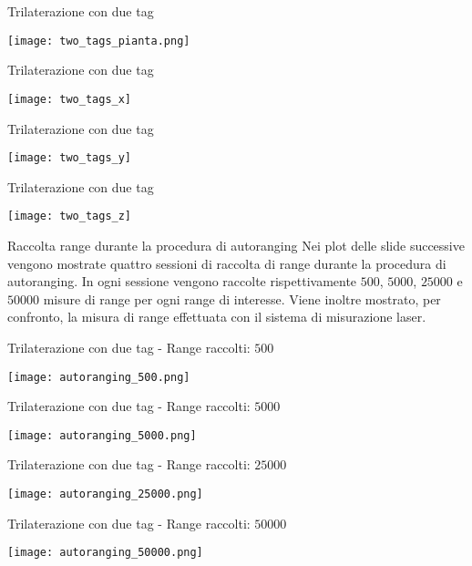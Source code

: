 \begin{frame}{Trilaterazione con due tag}
  \begin{center}
    \texttt{[image: two\_tags\_pianta.png]}
  \end{center}
\end{frame}

\begin{frame}{Trilaterazione con due tag}
  \begin{center}
    \texttt{[image: two\_tags\_x]}
  \end{center}
\end{frame}

\begin{frame}{Trilaterazione con due tag}
  \begin{center}
    \texttt{[image: two\_tags\_y]}
  \end{center}
\end{frame}

\begin{frame}{Trilaterazione con due tag}
  \begin{center}
    \texttt{[image: two\_tags\_z]}
  \end{center}
\end{frame}

\begin{frame}{Raccolta range durante la procedura di autoranging}
  Nei plot delle slide successive vengono mostrate quattro sessioni di raccolta di range durante la procedura di autoranging.
  In ogni sessione vengono raccolte rispettivamente $500$, $5000$, $25000$ e $50000$ misure di range per ogni range di interesse. Viene inoltre mostrato, per confronto, la misura di range effettuata con il sistema di misurazione laser.
\end{frame}

\begin{frame}{Trilaterazione con due tag - Range raccolti: $500$}
  \begin{center}
    \texttt{[image: autoranging\_500.png]}
  \end{center}
\end{frame}

\begin{frame}{Trilaterazione con due tag - Range raccolti: $5000$}
  \begin{center}
    \texttt{[image: autoranging\_5000.png]}
  \end{center}
\end{frame}

\begin{frame}{Trilaterazione con due tag - Range raccolti: $25000$}
  \begin{center}
    \texttt{[image: autoranging\_25000.png]}
  \end{center}
\end{frame}

\begin{frame}{Trilaterazione con due tag - Range raccolti: $50000$}
  \begin{center}
    \texttt{[image: autoranging\_50000.png]}
  \end{center}
\end{frame}

